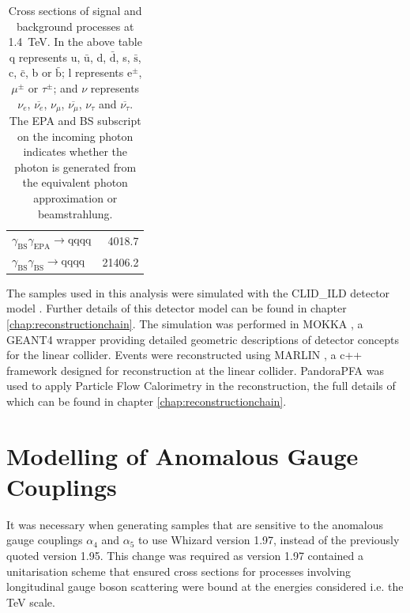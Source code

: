 \begin{table}[h!]
\begin{tabular}{ l r }
$\gamma_{\text{BS}}\gamma_{\text{EPA}} \rightarrow \text{qqqq}$ & 4018.7\\
$\gamma_{\text{BS}}\gamma_{\text{BS}} \rightarrow \text{qqqq}$ & 21406.2\\
\hline
\end{tabular}
\caption[Cross sections of signal and background processes at 1.4~TeV]{Cross sections of signal and background processes at 1.4~TeV.  In the above table q represents u, $\bar{\text{u}}$, d, $\bar{\text{d}}$, s, $\bar{\text{s}}$, c, $\bar{\text{c}}$, b or $\bar{\text{b}}$;  l represents $\text{e}^{\pm}$, $\mu^{\pm}$ or $\tau^{\pm}$; and $\nu$ represents $\nu_{e}$, $\overline{\nu_{e}}$, $\nu_{\mu}$, $\overline{\nu_{\mu}}$, $\nu_{\tau}$ and $\overline{\nu_{\tau}}$.  The EPA and BS subscript on the incoming photon indicates whether the photon is generated from the equivalent photon approximation or beamstrahlung.}
\label{table:crosssection1400GeV}
\end{table}

The samples used in this analysis were simulated with the CLID\_ILD detector model \cite{arXiv:1006.3396}.  Further details of this detector model can be found in chapter \ref{chap:reconstructionchain}.  The simulation was performed in MOKKA \cite{MoradeFreitas:2002kj}, a GEANT4 \cite{Agostinelli:2002hh} wrapper providing detailed geometric descriptions of detector concepts for the linear collider.  Events were reconstructed using MARLIN \cite{Gaede:2006pj}, a c++ framework designed for reconstruction at the linear collider.  PandoraPFA \cite{arXiv:0907.3577, arXiv:1209.4039} was used to apply Particle Flow Calorimetry in the reconstruction, the full details of which can be found in chapter \ref{chap:reconstructionchain}.
 

\section{Modelling of Anomalous Gauge Couplings}
\label{sec:modellingofanomalouscouplings}
It was necessary when generating samples that are sensitive to the anomalous gauge couplings $\alpha_{4}$ and $\alpha_{5}$ to use Whizard version 1.97, instead of the previously quoted version 1.95.  This change was required as version 1.97 contained a unitarisation scheme that ensured cross sections for processes involving longitudinal gauge boson scattering were bound at the energies considered i.e. the TeV scale.  

